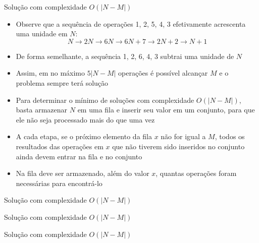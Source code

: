\begin{frame}[fragile]{Solução com complexidade $O(|N - M|)$}

    \begin{itemize}
        \item Observe que a sequência de operações 1, 2, 5, 4, 3 efetivamente acrescenta 
            uma unidade em $N$:
            \[
                N \to 2N \to 6N \to 6N + 7 \to 2N + 2 \to N + 1
            \]

        \item De forma semelhante, a sequência 1, 2, 6, 4, 3 subtrai uma unidade de $N$

        \item Assim, em no máximo $5|N - M|$ operações é possível alcançar $M$ e o problema sempre 
            terá solução

        \item Para determinar o mínimo de soluções com complexidade $O(|N - M|)$, basta armazenar
            $N$ em uma fila e inserir seu valor em um conjunto, para que ele não seja processado
            mais do que uma vez

        \item A cada etapa, se o próximo elemento da fila $x$ não for igual a $M$, todos os 
            resultados
            das operações em $x$ que não tiverem sido inseridos no conjunto ainda devem
            entrar na fila e no conjunto

        \item Na fila deve ser armazenado, além do valor $x$, quantas operações foram necessárias
            para encontrá-lo

   \end{itemize}

\end{frame}

\begin{frame}[fragile]{Solução com complexidade $O(|N - M|)$}
\end{frame}

\begin{frame}[fragile]{Solução com complexidade $O(|N - M|)$}
\end{frame}

\begin{frame}[fragile]{Solução com complexidade $O(|N - M|)$}
\end{frame}
